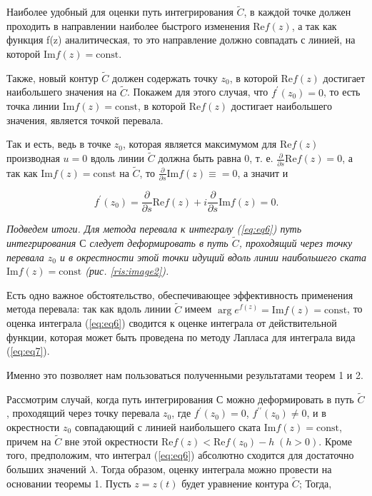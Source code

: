 \documentclass[14pt]{extarticle}
\renewcommand{\Re}{\mathrm{Re}}
\renewcommand{\Im}{\mathrm{Im}}
\newcommand{\const}{\mathrm{const}}
\begin{document}
Наиболее удобный для оценки путь интегрирования $\widetilde{C}$, в каждой точке должен проходить в направлении наиболее быстрого изменения $\Re f(z)$, а так как функция f(z) аналитическая, то это направление должно совпадать с линией, на которой $\Im f(z) = \const$. 

Также, новый контур $\widetilde{C}$ должен содержать точку $z_0$, в которой $\Re f(z)$ достигает наибольшего значения на $\widetilde{C}$. Покажем для этого случая, что $f^\prime (z_0) = 0$, то есть точка линии $\Im f(z) = \const$, в которой $\Re f (z)$ достигает наибольшего значения, является точкой перевала.

Так и есть, ведь в точке $z_0$, которая является максимумом для $\Re f (z)$ производная $u=0$ вдоль линии $\widetilde{C}$ должна быть равна 0, т. е. $\frac{\partial}{\partial s}\Re f(z)=0$, а так как $\Im f(z) = \const$ на $\widetilde{C}$, то $\frac{\partial}{\partial s} \Im f(z) \equiv = 0$, а значит и 

$$
f^\prime(z_0) = \frac{\partial}{\partial s} \Re f(z) + i\frac{\partial}{\partial s} \Im f(z) = 0.
$$ 
  
\textit{Подведем итоги. Для метода перевала к интегралу (\ref{eq:eq6}) путь интегрирования $С$ следует деформировать в путь $\widetilde{C}$, проходящий через точку перевала $z_0$ и в окрестности этой точки идущий вдоль линии наибольшего ската $\Im f(z) = \const$ (рис. \ref{ris:image2}).}

Есть одно важное обстоятельство, обеспечивающее эффективность применения метода перевала: так как вдоль линии $\widetilde{C}$ имеем $\arg e^{f(z)} = \Im f(z) = \const$, то оценка интеграла (\ref{eq:eq6}) сводится к оценке интеграла от действительной функции, которая может быть проведена по методу Лапласа для интеграла вида (\ref{eq:eq7}).  

Именно это позволяет нам пользоваться полученными результатами теорем 1 и 2. 

Рассмотрим  случай, когда путь интегрирования $С$ можно деформировать в путь $\widetilde{C}$, проходящий через точку перевала $z_0$, где $f^\prime(z_0) = 0$, $f^{\prime\prime}(z_0)\neq0$, и в окрестности $z_0$ совпадающий с линией наибольшего ската $\Im f(z) = \const$, причем на $\widetilde{C}$ вне этой окрестности $\Re f(z) < \Re f(z_0) - h \;(h> 0)$. Кроме того, предположим, что интеграл (\ref{eq:eq6}) абсолютно сходится для достаточно больших значений $\lambda$.
Тогда образом, оценку интеграла можно провести на основании теоремы 1. Пусть $z = z(t)$ будет уравнение контура $\widetilde{C}$; Тогда,
\end{document}
